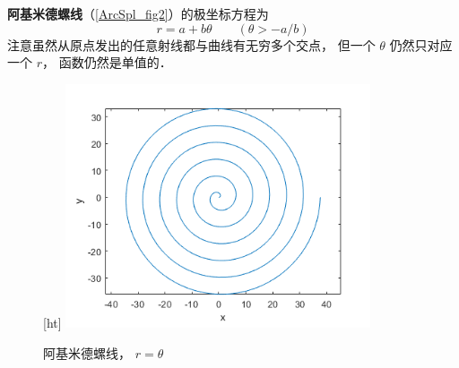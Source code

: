 

\textbf{阿基米德螺线}（\autoref{ArcSpl_fig2}）的极坐标方程为
\begin{equation}
r = a + b\theta \qquad (\theta > -a/b)
\end{equation}
注意虽然从原点发出的任意射线都与曲线有无穷多个交点， 但一个 $\theta$ 仍然只对应一个 $r$， 函数仍然是单值的．

\begin{figure}\label{ArcSpl_fig2}[ht]
\centering
\includegraphics[width=9cm]{./figures/ArcSpl1.png}
\caption{阿基米德螺线， $r = \theta$} \label{ArcSpl_fig1}
\end{figure}

